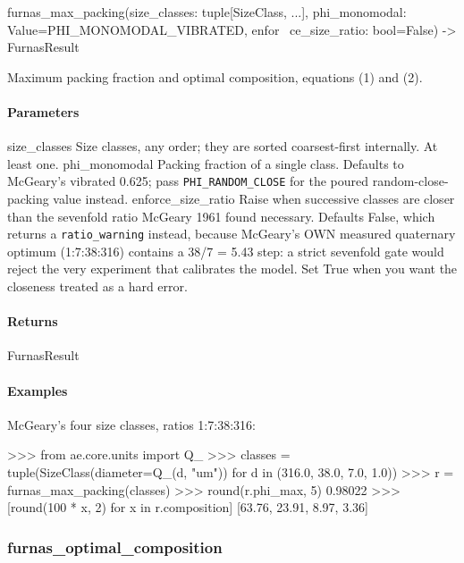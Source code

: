 \documentclass[10pt,a4paper,twoside]{report}
\begin{document}
\begin{verbatimsmall}
furnas_max_packing(size_classes: tuple[SizeClass, ...], phi_monomodal: Value=PHI_MONOMODAL_VIBRATED, enfor
    \ ce_size_ratio: bool=False) -> FurnasResult
\end{verbatimsmall}

Maximum packing fraction and optimal composition, equations (1) and (2).

\paragraph*{Parameters}

size\_classes Size classes, any order; they are sorted coarsest-first internally. At least one. phi\_monomodal Packing fraction of a single class. Defaults to McGeary's vibrated 0.625; pass \texttt{PHI\_RANDOM\_CLOSE} for the poured random-close-packing value instead. enforce\_size\_ratio Raise when successive classes are closer than the sevenfold ratio McGeary 1961 found necessary. Defaults False, which returns a \texttt{ratio\_warning} instead, because McGeary's OWN measured quaternary optimum (1:7:38:316) contains a 38/7 = 5.43 step: a strict sevenfold gate would reject the very experiment that calibrates the model. Set True when you want the closeness treated as a hard error.

\paragraph*{Returns}

FurnasResult

\paragraph*{Examples}

McGeary's four size classes, ratios 1:7:38:316:

\begin{doctestblock}
>>> from ae.core.units import Q_
>>> classes = tuple(SizeClass(diameter=Q_(d, "um")) for d in (316.0, 38.0, 7.0, 1.0))
>>> r = furnas_max_packing(classes)
>>> round(r.phi_max, 5)
0.98022
>>> [round(100 * x, 2) for x in r.composition]
[63.76, 23.91, 8.97, 3.36]
\end{doctestblock}

\subsubsection*{furnas\_optimal\_composition}
\end{document}
